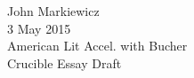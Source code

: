 \documentclass[10pt]{article}
\begin{document}
\begin{raggedleft}
	John Markiewicz \\
	3 May 2015 \\
	American Lit Accel. with Bucher \\
	Crucible Essay Draft \\
\end{raggedleft}
\begin{center}

\end{center}
\end{document}
